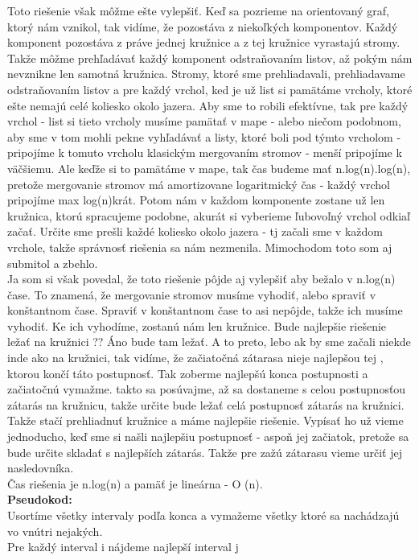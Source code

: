 \documentclass[a4paper,11pt]{article}
\begin{document}
Toto riešenie však  môžme ešte vylepšiť. Keď sa pozrieme na orientovaný graf, ktorý nám vznikol, tak vidíme, že pozostáva z niekoľkých komponentov. Každý komponent pozostáva z práve jednej kružnice a z tej kružnice vyrastajú stromy.
Takže môžme prehľadávať každý komponent odstraňovaním listov, až pokým nám nevznikne len samotná kružnica. Stromy, ktoré sme prehliadavali, prehliadavame odstraňovaním listov a pre každý vrchol, ked je už list si pamätáme vrcholy, ktoré ešte nemajú celé koliesko okolo jazera. Aby sme to robili efektívne, tak pre každý vrchol - list si tieto vrcholy musíme pamätať v mape - alebo niečom podobnom, aby sme v tom mohli pekne vyhľadávať a listy, ktoré boli pod týmto vrcholom - pripojíme k tomuto vrcholu klasickým mergovaním stromov - menší pripojíme k väčšiemu. Ale keďže si to pamätáme v mape, tak čas budeme mať n.log(n).log(n), pretože mergovanie stromov má amortizovane logaritmický čas - každý vrchol pripojíme max log(n)krát. Potom nám v každom komponente zostane už len kružnica, ktorú spracujeme podobne, akurát si vyberieme ľubovoľný vrchol odkiaľ začať. Určite sme prešli každé koliesko okolo jazera - tj začali sme v každom vrchole, takže správnosť riešenia sa nám nezmenila. Mimochodom toto som aj submitol a zbehlo.\\
Ja som si však povedal, že toto riešenie pôjde aj vylepšiť aby bežalo v n.log(n) čase. To znamená, že mergovanie stromov musíme vyhodiť, alebo spraviť v konštantnom čase. Spraviť v konštantnom čase to asi nepôjde, takže ich musíme vyhodiť. Ke ich vyhodíme, zostanú nám len kružnice. Bude najlepšie riešenie ležať na kružnici ?? Áno bude tam ležať. A to preto, lebo ak by sme začali niekde inde ako na kružnici, tak vidíme, že začiatočná zátarasa nieje najlepšou tej , ktorou končí táto postupnosť. Tak zoberme najlepšú konca postupnosti a začiatočnú vymažme. takto sa posúvajme, až sa dostaneme s celou postupnosťou zátarás na kružnicu, takže určite bude ležať celá postupnosť zátarás na kružnici. Takže stačí prehliadnuť kružnice a máme najlepšie riešenie.
Vypísať ho už vieme jednoducho, keď sme si našli najlepšiu postupnosť - aspoň jej začiatok, pretože sa bude určite skladať s najlepších zátarás. Takže pre zažú zátarasu vieme určiť jej nasledovníka.\\

Čas riešenia je n.log(n) a pamäť je lineárna  - O (n).\\


\textbf{Pseudokod: }\\
Usortíme všetky intervaly podľa konca a vymažeme všetky ktoré sa nachádzajú vo vnútri nejakých.\\
Pre každý interval i nájdeme najlepší interval j\\
\end{document}
